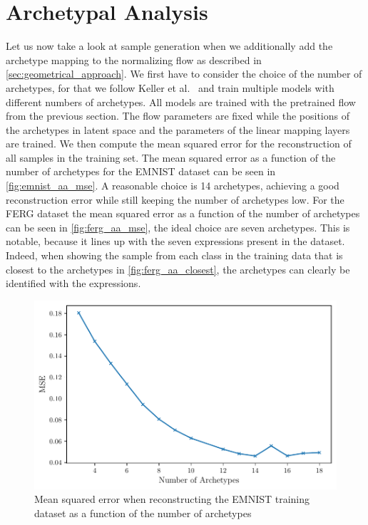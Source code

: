 \section{Archetypal Analysis}%
\label{sec:archetypal_analysis}

Let us now take a look at sample generation when we additionally add the
archetype mapping to the normalizing flow as described in
\autoref{sec:geometrical_approach}. We first have to consider the choice of the
number of archetypes, for that we follow Keller et
al.~\citep{kellerLearningExtremalRepresentations2020} and train multiple models
with different numbers of archetypes. All models are trained with the
pretrained flow from the previous section. The flow parameters are fixed while
the positions of the archetypes in latent space and the parameters of the
linear mapping layers are trained. We then compute
the mean squared error for the reconstruction of all samples in the training
set. The mean squared error as a function of the number of archetypes for the
EMNIST dataset can be seen in \autoref{fig:emnist_aa_mse}. A reasonable choice
is 14 archetypes, achieving a good reconstruction error while still keeping the
number of archetypes low. For the FERG dataset the mean squared error as a
function of the number of archetypes can be seen in \autoref{fig:ferg_aa_mse},
the ideal choice are seven archetypes. This is notable, because it lines up
with the seven expressions present in the dataset. Indeed,
when showing the sample from each class in the training data that is closest to
the archetypes in \autoref{fig:ferg_aa_closest}, the archetypes can clearly be
identified with the expressions.

\begin{figure}[htpb]
	\centering
	\includegraphics{figures/samples/aa_mse_EMNIST.pdf}
	\caption{Mean squared error when reconstructing the EMNIST training
		dataset as a function of the number of archetypes}%
	\label{fig:emnist_aa_mse}
\end{figure}

